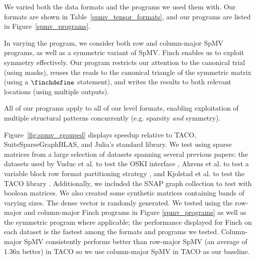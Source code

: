   We varied both the data formats and the programs we used them with. Our formats
  are shown in Table~\ref{spmv_tensor_formats}, and our programs are listed in
  Figure~\ref{spmv_programs}.
  
  In varying the program, we consider both row and column-major SpMV programs, as
  well as a symmetric variant of SpMV. Finch enables us to exploit symmetry
  effectively. Our program restricts our attention to the canonical trial (using
  masks), reuses the reads to the canonical triangle of the symmetric matrix
  (using a $\finchdefine$ statement), and writes the results to both relevant
  locations (using multiple outputs).
  
  All of our programs apply to all of our level formats, enabling exploitation of multiple structural patterns concurrently (e.g. sparsity \textit{and} symmetry).
  
  Figure~\ref{fig:spmv_grouped} displays speedup relative to TACO, SuiteSparseGraphBLAS, and Julia’s standard library.  We test using sparse matrices from a large selection of datasets spanning several previous papers: the datasets used by Vuduc et al. to test the OSKI interface \cite{vuduc2005oski}, Ahrens et al. to test a variable block row format partitioning strategy \cite{ahrens_optimal_2021}, and Kjolstad et al. to test the TACO library \cite{kjolstad_tensor_2017}. Additionally, we included the SNAP graph collection to test with boolean matrices. We also created some synthetic matrices containing bands of varying sizes.
  The dense vector is randomly generated. We tested using the row-major and column-major Finch programs in Figure \ref{spmv_programs} as well as the symmetric program where applicable; the performance displayed for Finch on each dataset is the fastest among the formats and programs we tested. Column-major SpMV consistently performs better than row-major SpMV (an average of 1.36x better) in TACO so we use column-major SpMV in TACO as our baseline.
  
